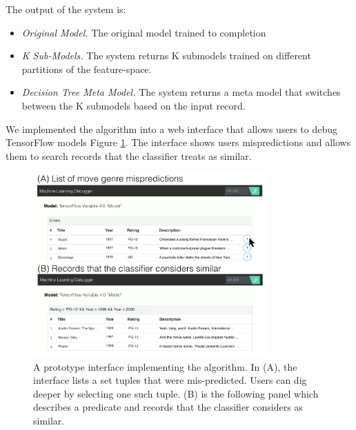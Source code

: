 The output of the system is:
\begin{itemize}
\item \emph{Original Model. } The original model trained to completion

\item \emph{K Sub-Models. } The system returns K submodels trained on different partitions of the feature-space.

\item \emph{Decision Tree Meta Model. } The system returns a meta model that switches between the K submodels based on the input record.
\end{itemize}

We implemented the algorithm into a web interface that allows users to debug TensorFlow models Figure \ref{fig:interface}. The interface shows users mispredictions and allows them to search records that the classifier treats as similar.

\begin{figure}[t]
    \centering
    \includegraphics[width=0.8\textwidth]{figures/interface.png}
    \caption{A prototype interface implementing the algorithm. In (A), the interface lists a set tuples that were mis-predicted. Users can dig deeper by selecting one such tuple. (B) is the following panel which describes a predicate and records that the classifier considers as similar.}
    \label{fig:interface}
\end{figure}